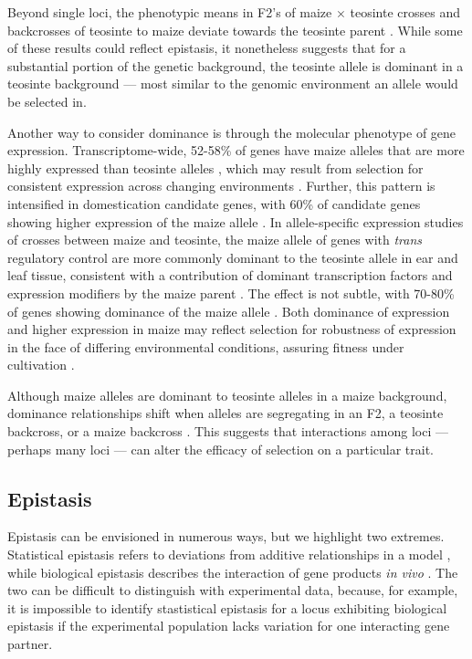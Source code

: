 \documentclass[9pt,twocolumn,twoside]{rilabRxiv}
\begin{document}
Beyond single loci, the phenotypic means in F2's of maize $\times$ teosinte crosses and backcrosses of teosinte to maize deviate towards the teosinte parent \citep{lambert1965, doebley1990, doebley1993,  doebley1995}.
While some of these results could reflect epistasis, it nonetheless suggests that for a substantial portion of the genetic background, the teosinte allele is dominant in a teosinte background --- most similar to the genomic environment an allele would be selected in.

Another way to consider dominance is through the molecular phenotype of gene expression.
Transcriptome-wide, 52-58\% of genes have maize alleles that are more highly expressed than teosinte alleles \citep{hufford2012natgen, swansonwagner2012, lemmon2014eqtl, wang2017}, which may result from selection for consistent expression across changing environments \citep{doebley1995, lorant2017}.
Further, this pattern is intensified in domestication candidate genes, with 60\% of candidate genes showing higher expression of the maize allele \citep{hufford2012natgen, swansonwagner2012}.
In allele-specific expression studies of crosses between maize and teosinte, the maize allele of genes with \textit{trans} regulatory control are more commonly dominant to the teosinte allele in ear and leaf tissue,  consistent with a contribution of dominant transcription factors and expression modifiers by the maize parent \citep{lemmon2014eqtl}.
The effect is not subtle, with 70-80\% of genes showing dominance of the maize allele \citep{lemmon2014eqtl}.
Both dominance of expression and higher expression in maize may reflect selection for robustness of expression in the face of differing environmental conditions, assuring fitness under cultivation \citep{doebley1995}.

Although maize alleles are dominant to teosinte alleles in a maize background, dominance relationships shift when alleles are segregating in an F2, a teosinte backcross, or a maize backcross \citep{doebley1995, briggs2007, doust2014}.
This suggests that interactions among loci --- perhaps many loci --- can alter the efficacy of selection on a particular trait.

\subsection*{Epistasis}

Epistasis can be envisioned in numerous ways, but we highlight two extremes.
Statistical epistasis refers to deviations from additive relationships in a model \citep{fisher1918}, while biological epistasis describes the interaction of gene products \textit{in vivo} \citep{bateson1909}.
The two can be difficult to distinguish with experimental data, because, for example, it is impossible to identify stastistical epistasis for a locus exhibiting biological epistasis if the experimental population lacks variation for one interacting gene partner.
\end{document}
